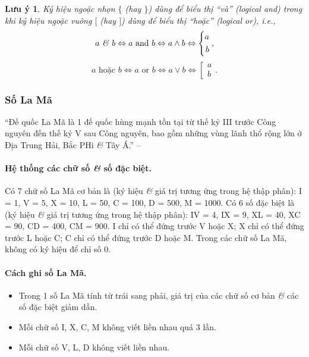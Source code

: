 \documentclass{article}
\numberwithin{equation}{section}
\newtheorem{luuy}{Lưu ý}[section]
\begin{document}
\begin{luuy}
	Ký hiệu ngoặc nhọn $\{$ (hay $\}$) dùng để biểu thị ``và'' (logical and) trong khi ký hiệu ngoặc vuông $[$ (hay $]$) dùng để biểu thị ``hoặc'' (logical or), i.e.,
	\begin{equation*}
		a\mbox{ \textit{\&} } b\Leftrightarrow a\mbox{ and } b\Leftrightarrow a\land b\Leftrightarrow\left\{\begin{split}
			a\\b
		\end{split}\right.,	
	\end{equation*}
	\begin{equation*}
		a\mbox{ hoặc } b\Leftrightarrow a\mbox{ or } b\Leftrightarrow a\lor b\Leftrightarrow\left[\begin{split}
			a\\b
		\end{split}\right..
	\end{equation*}
\end{luuy}

\subsubsection{Số La Mã}
``Đế quốc La Mã là 1 đế quốc hùng mạnh tồn tại từ thế kỷ III trước Công nguyên đến thế kỷ V sau Công nguyên, bao gồm những vùng lãnh thổ rộng lớn ở Địa Trung Hải, Bắc PHi \textit{\&} Tây Á.'' -- \cite[p. 14]{SGK_Toan_6_Canh_Dieu_tap_1}

\paragraph{Hệ thống các chữ số \textit{\&} số đặc biệt.} Có 7 chữ số La Mã cơ bản là (ký hiệu \textit{\&} giá trị tương ứng trong hệ thập phân): I = 1, V = 5, X = 10, L = 50, C = 100, D = 500, M = 1000. Có 6 số đặc biệt là (ký hiệu \textit{\&} giá trị tương ứng trong hệ thập phân): IV = 4, IX = 9, XL = 40, XC = 90, CD = 400, CM = 900. I chỉ có thể đứng trước V hoặc X; X chỉ có thể đứng trước L hoặc C; C chỉ có thể đứng trước D hoặc M. Trong các chữ số La Mã, không có ký hiệu để chỉ số 0.

\paragraph{Cách ghi số La Mã.}
\begin{itemize}
	\item Trong 1 số La Mã tính từ trái sang phải, giá trị của các chữ số cơ bản \textit{\&} các số đặc biệt giảm dần.
	\item Mỗi chữ số I, X, C, M không viết liền nhau quá 3 lần.
	\item Mỗi chữ số V, L, D không viết liền nhau.
\end{itemize}
\end{document}
